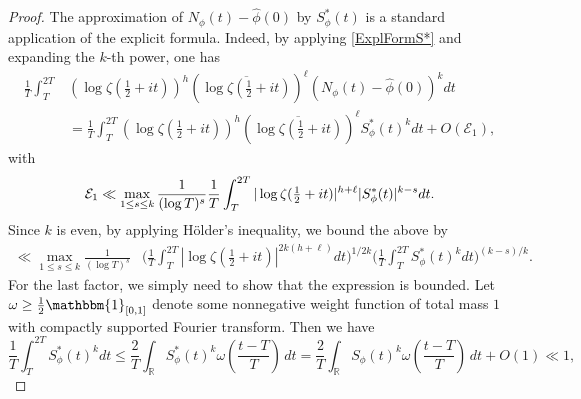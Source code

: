 \documentclass[12pt,oneside,english,a4paper]{amsart}
\theoremstyle{remark}
\numberwithin{equation}{section}
\newcommand{\Starphi}{S_\phi^*}
\begin{document}
\begin{proof}
The approximation of $N_\phi(t)-\hat\phi(0)$ by $\Starphi(t)$ is a standard application of the explicit formula. Indeed, by applying \eqref{ExplFormS*} and expanding the $k$-th power, one has
    \begin{equation}\begin{split}\label{28feb.1}
        \frac{1}{T} \int_T^{2T} &(\log\zeta(\tfrac{1}{2}+it))^h (\overline{\log\zeta(\tfrac{1}{2}+it)})^\ell (N_\phi(t)-\hat\phi(0))^k dt \\
        &= \frac{1}{T}\int_T^{2T} (\log\zeta(\tfrac{1}{2}+it))^h (\overline{\log\zeta(\tfrac{1}{2}+it)})^\ell \Starphi(t)^k dt 
        +O(\mathcal E_1),
    \end{split}\end{equation}
    with 
    \begin{align*} 
        \mathcal E_1 
        \notag \ll \max_{1\leq s\leq k} \frac{1}{(\log T)^s} \frac{1}{T}\int_T^{2T} |\log\zeta(\tfrac{1}{2}+it)|^{h+\ell} |\Starphi(t)|^{k-s} dt .
    \end{align*}
    Since $k$ is even, by applying H\"older's inequality, we bound the above by
        \begin{equation}\begin{split}\label{22may.1}
        \ll \max_{1\leq s\leq k} \frac{1}{(\log T)^s} &\bigg(\frac{1}{T}\int_T^{2T} |\log\zeta(\tfrac{1}{2}+it)|^{2k(h+\ell)} dt \bigg)^{1/2k} 
        \bigg(\frac{1}{T}\int_T^{2T} \Starphi(t)^{k} dt \bigg)^{(k-s)/k}.
    \end{split}\end{equation}
    For the last factor, we simply need to show that the expression is bounded. Let $\omega \ge \tfrac{1}{2} \mathbbm{1}_{[0,1]}$ denote some nonnegative weight function of total mass $1$ with compactly supported Fourier transform. Then we have
    \begin{equation}\label{HRMomentBound}
        \frac{1}{T}\int_T^{2T} \Starphi(t)^{k} dt 
        \le \frac{2}{T} \int_{\mathbb{R}} \Starphi(t)^{k} \omega \left( \frac{t-T}{T} \right) \,dt
        = \frac{2}{T} \int_{\mathbb{R}} S_\phi(t)^{k} \omega \left( \frac{t-T}{T} \right) \,dt + O(1)
        \ll 1,
    \end{equation}

\end{proof}
\end{document}
